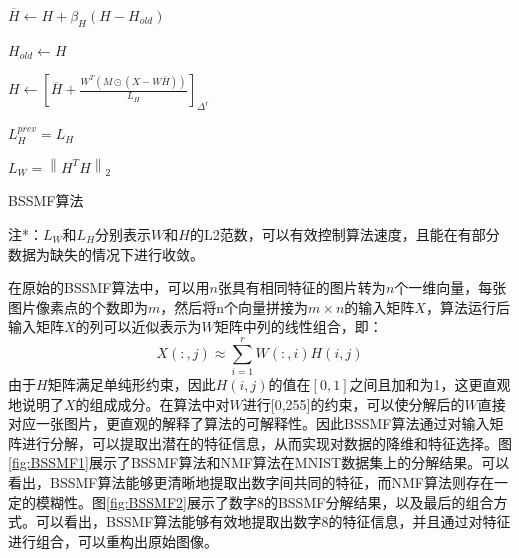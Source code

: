 \documentclass[12pt]{article}
\begin{document}
\begin{algorithm}[H]
{{            $\overline{H} \leftarrow H + \beta_H (H - H_{old})$

            $H_{old} \leftarrow H$
            
            $H \leftarrow \left[ \overline{H} + \frac{W^T(M \odot (X - W\overline{H}))}{L_H} \right]_{\Delta^r}$

            $L^{prev}_H = L_H$
            }
        $L_W = \left\lVert H^TH\right\rVert_2$
    }
    
    \caption{BSSMF算法}
    \label{algo}
    \small 注*：$L_W $和$L_H$分别表示$W$和$H$的L2范数，可以有效控制算法速度，且能在有部分数据为缺失的情况下进行收敛\cite{Lip}。
    
  \end{algorithm}\DecMargin{1em}

在原始的BSSMF算法中，可以用$n$张具有相同特征的图片转为$n$个一维向量，每张图片像素点的个数即为$m$，然后将n个向量拼接为$m\times n$的输入矩阵$X$，算法运行后输入矩阵$X$的列可以近似表示为$W$矩阵中列的线性组合，即：
\begin{equation}
    X(:,j) \approx \sum_{i=1}^{r} W(:,i)H(i,j)
    \label{eq:linear_combination}
\end{equation}
由于$H$矩阵满足单纯形约束，因此$H(i,j)$的值在$[0,1]$之间且加和为1，这更直观地说明了$X$的组成成分。在算法中对$W$进行[0,255]的约束，可以使分解后的$W$直接对应一张图片，更直观的解释了算法的可解释性。因此BSSMF算法通过对输入矩阵进行分解，可以提取出潜在的特征信息，从而实现对数据的降维和特征选择。图\ref{fig:BSSMF1}展示了BSSMF算法和NMF算法在MNIST数据集上的分解结果。可以看出，BSSMF算法能够更清晰地提取出数字间共同的特征，而NMF算法则存在一定的模糊性。图\ref{fig:BSSMF2}展示了数字8的BSSMF分解结果，以及最后的组合方式。可以看出，BSSMF算法能够有效地提取出数字8的特征信息，并且通过对特征进行组合，可以重构出原始图像\cite{BSSMF}。
\end{document}
